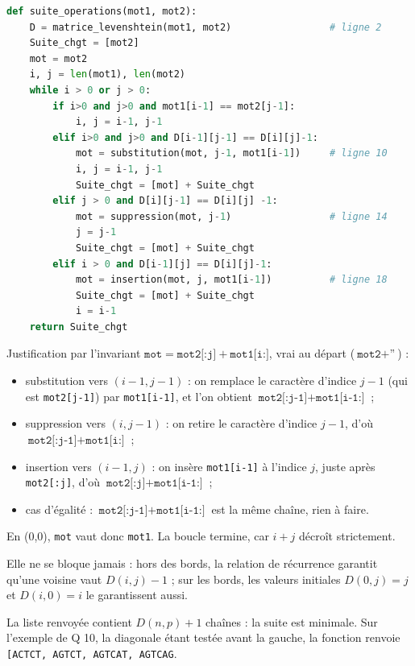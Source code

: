 \documentclass[11pt,a4paper]{article}
\providecommand{\tightlist}{\setlength{\itemsep}{0pt}\setlength{\parskip}{0pt}}
\begin{document}
\begin{lstlisting}[language=Python]
def suite_operations(mot1, mot2):
    D = matrice_levenshtein(mot1, mot2)                 # ligne 2
    Suite_chgt = [mot2]
    mot = mot2
    i, j = len(mot1), len(mot2)
    while i > 0 or j > 0:
        if i>0 and j>0 and mot1[i-1] == mot2[j-1]:
            i, j = i-1, j-1
        elif i>0 and j>0 and D[i-1][j-1] == D[i][j]-1:
            mot = substitution(mot, j-1, mot1[i-1])     # ligne 10
            i, j = i-1, j-1
            Suite_chgt = [mot] + Suite_chgt
        elif j > 0 and D[i][j-1] == D[i][j] -1:
            mot = suppression(mot, j-1)                 # ligne 14
            j = j-1
            Suite_chgt = [mot] + Suite_chgt
        elif i > 0 and D[i-1][j] == D[i][j]-1:
            mot = insertion(mot, j, mot1[i-1])          # ligne 18
            Suite_chgt = [mot] + Suite_chgt
            i = i-1
    return Suite_chgt
\end{lstlisting}

Justification par l'invariant \(\texttt{mot}=\texttt{mot2[:j]}+\texttt{mot1[i:]}\), vrai au départ (\(\texttt{mot2}+\texttt{''}\)) :

\begin{itemize}
\tightlist
\item
  substitution vers \((i-1,j-1)\) : on remplace le caractère d'indice \(j-1\) (qui est \texttt{mot2{[}j-1{]}}) par \texttt{mot1{[}i-1{]}}, et l'on obtient \(\texttt{mot2[:j-1]}+\texttt{mot1[i-1:]}\) ;
\item
  suppression vers \((i,j-1)\) : on retire le caractère d'indice \(j-1\), d'où \(\texttt{mot2[:j-1]}+\texttt{mot1[i:]}\) ;
\item
  insertion vers \((i-1,j)\) : on insère \texttt{mot1{[}i-1{]}} à l'indice \(j\), juste après \texttt{mot2{[}:j{]}}, d'où \(\texttt{mot2[:j]}+\texttt{mot1[i-1:]}\) ;
\item
  cas d'égalité : \(\texttt{mot2[:j-1]}+\texttt{mot1[i-1:]}\) est la même chaîne, rien à faire.
\end{itemize}

En (0,0), \texttt{mot} vaut donc \texttt{mot1}. La boucle termine, car \(i+j\) décroît strictement.

Elle ne se bloque jamais : hors des bords, la relation de récurrence garantit qu'une voisine vaut \(D(i,j)-1\) ; sur les bords, les valeurs initiales \(D(0,j)=j\) et \(D(i,0)=i\) le garantissent aussi.

La liste renvoyée contient \(D(n,p)+1\) chaînes : la suite est minimale. Sur l'exemple de Q 10, la diagonale étant testée avant la gauche, la fonction renvoie \texttt{{[}\textquotesingle{}ACTCT\textquotesingle{},\allowbreak{}\ \textquotesingle{}AGTCT\textquotesingle{},\allowbreak{}\ \textquotesingle{}AGTCAT\textquotesingle{},\allowbreak{}\ \textquotesingle{}AGTCAG\textquotesingle{}{]}\allowbreak{}}.
\end{document}
